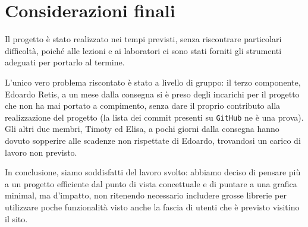 \documentclass[12pt, a4paper]{article}
\begin{document}
\section{Considerazioni finali}
Il progetto è stato realizzato nei tempi previsti, senza riscontrare particolari difficoltà, poiché alle lezioni e ai laboratori ci sono stati forniti gli strumenti adeguati per portarlo al termine. \par
L’unico vero problema riscontato è stato a livello di gruppo: il terzo componente, Edoardo Retis, a un mese dalla consegna si è preso degli incarichi per il progetto che non ha mai portato a compimento, senza dare il proprio contributo alla realizzazione del progetto (la lista dei commit presenti su \texttt{GitHub} ne è una prova). Gli altri due membri, Timoty ed Elisa, a pochi giorni dalla consegna hanno dovuto sopperire alle scadenze non rispettate di Edoardo, trovandosi un carico di lavoro non previsto. \par
\medskip
In conclusione, siamo soddisfatti del lavoro svolto: abbiamo deciso di pensare più a un progetto efficiente dal punto di vista concettuale e di puntare a una grafica minimal,  ma d’impatto, non ritenendo necessario includere grosse librerie per utilizzare poche funzionalità visto anche la fascia di utenti che è previsto visitino il sito.
\end{document}
